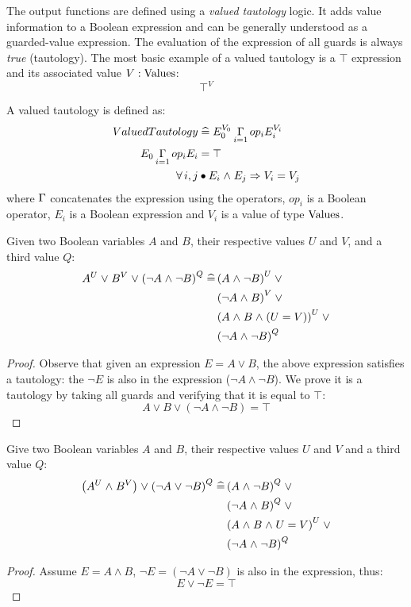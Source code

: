 The output functions are defined using a \emph{valued tautology} logic.
%
It adds value information to a Boolean expression and can be generally understood as a guarded-value expression. 
%
The evaluation of the expression of all guards is always \emph{true} (tautology).
%
The most basic example of a valued tautology is a $\top$ expression and its associated value $V : \mathrm{Values}$:
\[\top^V\]
\begin{definition}
A valued tautology is defined as:
\begin{align*}
ValuedTautology & \defs E_0^{V_0} \Concat_{i=1}op_i E_i^{V_i}
\\ E_0 \Concat_{i=1} op_i E_i & = \top
\\ \forall i, j & \bullet E_i \land E_j \implies V_i = V_j
\end{align*}
%
where $\operatorname*{\Gamma}$ concatenates the expression using the operators, $op_i$ is a Boolean operator, $E_i$ is a Boolean expression and $V_i$ is a value of type $\mathrm{Values}$.
\end{definition}

\begin{lemma}
Given two Boolean variables $A$ and $B$, their respective values $U$ and $V$, and a third value $Q$:
\begin{align*}
A^U \mathrel{\vee} B^V \mathrel{\vee} \left(\neg A \mathrel{\wedge} \neg B\right)^Q \mathrel{\widehat{=}} & 
\left(A \mathrel{\wedge} \neg B\right)^U \mathrel{\vee}
\\&  \left(\neg A \mathrel{\wedge} B\right)^V \mathrel{\vee} 
\\&  \left(A \mathrel{\wedge} B \mathrel{\wedge} \left(U = V\right) \right)^U \mathrel{\vee}
\\&  \left(\neg A \mathrel{\wedge} \neg B\right)^Q
\end{align*}

\end{lemma}
\begin{proof}
Observe that given an expression $E = A \lor B$, the above expression satisfies a tautology: the $\lnot E$ is also in the expression ($\lnot A \land \lnot B$).
%
We prove it is a tautology by taking all guards and verifying that it is equal to $\top$:
\[A \lor B \lor \left(\lnot A \land \lnot B\right) = \top \]
\end{proof}


\begin{lemma}
Give two Boolean variables $A$ and $B$, their respective values $U$ and $V$ and a third value $Q$:
\begin{align*}
\left(A^U \mathrel{\wedge} B^V\right) \mathrel{\vee} \left(\neg A \mathrel{\vee} \neg B\right)^Q \mathrel{\widehat{=}} & 
\left(A \mathrel{\wedge} \neg B \right)^Q \mathrel{\vee}
\\&\left(\neg A \mathrel{\wedge} B\right)^Q \mathrel{\vee}
\\&\left(A \mathrel{\wedge} B \mathrel{\wedge} U = V\right)^U \mathrel{\vee}
\\&\left(\neg A \mathrel{\wedge} \neg B\right)^Q
\end{align*}
\end{lemma}
\begin{proof}
Assume $E = A \land B$, $\lnot E = \left(\lnot A \lor \lnot B\right) $ is also in the expression, thus:
\[ E \lor \lnot E = \top \] 
\end{proof}

